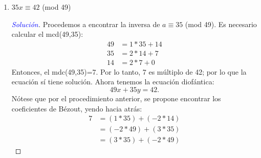 \documentclass[a4paper,12pt]{article}
\newenvironment{solution}
  {\renewcommand\qedsymbol{$\square$}\begin{proof}[\textcolor{blue}{Solución}]}
  {\end{proof}}
\begin{document}
\begin{enumerate}
		\begin{solution}
		Procedemos a encontrar la inversa de $a\equiv 21 $ (mod 30). Es necesario calcular el mcd(30,21):
		\begin{align*}
			30 &= 1*21 + 9\\
			21 &= 2*9 + 3\\
			9 &= 3*3 + 0
		\end{align*}
		Entonces, el mdc(30,21)=3.  Por lo tanto, 3 es múltiplo de 18; por lo que la ecuación sí tiene solución. Ahora tenemos la ecuación diofántica:
		$$30x+21y=18.$$ 
		Nótese que por el procedimiento anterior, se propone encontrar los coeficientes de Bézout, yendo hacia atrás:
		\begin{align*}
3	&=	(1 * 21) + (-2 * 9)\\
&=	(-2 * 30) + (3 * 21)\\
&=	(3 * 21) + (-2 * 30)
		\end{align*}
		Nótese que sí multiplcamos por 6, entonces tenemos 2 soluciones: 
		$$x_0=-12 \qquad y \qquad y_0=18$$
		Para encontar las soluciones generales, tenemos las siguientes ecuaciones demostradas en clase: 
		\begin{center}
		\end{center}
		Por lo tanto: 
		$$s=-\frac{\lambda 30}{3}=-10\lambda \qquad y \qquad t=\frac{\lambda 21}{3}=7\lambda.$$
		Por lo tanto, la solución: 
		$$x=-12+7\lambda \qquad y \qquad  y= 18-10\lambda.$$	
			Las soluciones particulares son triviales.
	\end{solution}
	\item $35x \equiv 42$ (mod 49)
		\begin{solution}
		Procedemos a encontrar la inversa de $a\equiv 35 $ (mod 49). Es necesario calcular el mcd(49,35):
		\begin{align*}
49 &= 1*35 + 14\\
35 &= 2*14 + 7\\
14 &= 2*7 + 0
		\end{align*}
		Entonces, el mdc(49,35)=7.  Por lo tanto, 7 es múltiplo de 42; por lo que la ecuación sí tiene solución. Ahora tenemos la ecuación diofántica:
		$$49x+35y=42.$$ 
		Nótese que por el procedimiento anterior, se propone encontrar los coeficientes de Bézout, yendo hacia atrás:
		\begin{align*}
7	&=	(1 * 35) + (-2 * 14)\\
&=	(-2 * 49) + (3 * 35)\\
&=	(3 * 35) + (-2 * 49)

\end{align*}
\end{solution}
\end{enumerate}
\end{document}
